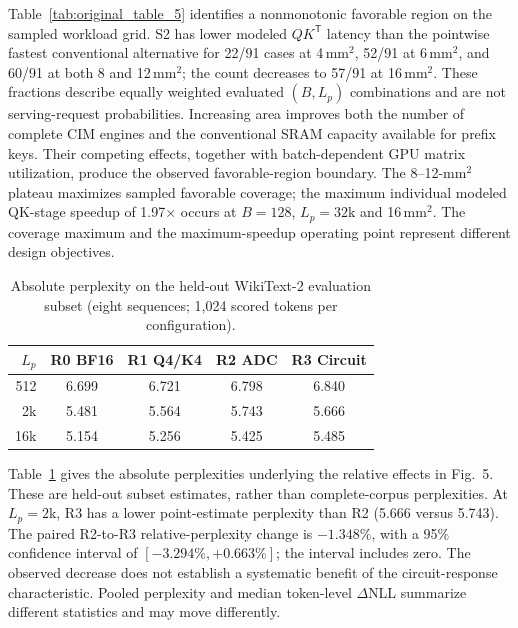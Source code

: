 Table~\ref{tab:original_table_5} identifies a nonmonotonic favorable region on the sampled workload grid. S2 has lower modeled $QK^{\mathsf T}$ latency than the pointwise fastest conventional alternative for 22/91 cases at 4\,mm$^2$, 52/91 at 6\,mm$^2$, and 60/91 at both 8 and 12\,mm$^2$; the count decreases to 57/91 at 16\,mm$^2$. These fractions describe equally weighted evaluated $(B,L_p)$ combinations and are not serving-request probabilities. Increasing area improves both the number of complete CIM engines and the conventional SRAM capacity available for prefix keys. Their competing effects, together with batch-dependent GPU matrix utilization, produce the observed favorable-region boundary. The 8--12-mm$^2$ plateau maximizes sampled favorable coverage; the maximum individual modeled QK-stage speedup of 1.97$\times$ occurs at $B=128$, $L_p=32$k and 16\,mm$^2$. The coverage maximum and the maximum-speedup operating point represent different design objectives.


\begin{table}[t]
\caption{Absolute perplexity on the held-out WikiText-2 evaluation subset
(eight sequences; 1,024 scored tokens per configuration).}
\label{tab:tetc_absolute_ppl}
\centering
\begin{tabular}{rcccc}
\hline
$L_p$ & R0 BF16 & R1 Q4/K4 & R2 ADC & R3 Circuit\\
\hline
512 & 6.699 & 6.721 & 6.798 & 6.840\\
2k & 5.481 & 5.564 & 5.743 & 5.666\\
16k & 5.154 & 5.256 & 5.425 & 5.485\\
\hline
\end{tabular}
\end{table}
Table~\ref{tab:tetc_absolute_ppl} gives the absolute perplexities underlying the relative effects in Fig.~5. These are held-out subset estimates, rather than complete-corpus perplexities. At $L_p=2$k, R3 has a lower point-estimate perplexity than R2 (5.666 versus 5.743). The paired R2-to-R3 relative-perplexity change is $-1.348\%$, with a 95\% confidence interval of $[-3.294\%,+0.663\%]$; the interval includes zero. The observed decrease does not establish a systematic benefit of the circuit-response characteristic. Pooled perplexity and median token-level $\Delta$NLL summarize different statistics and may move differently.

